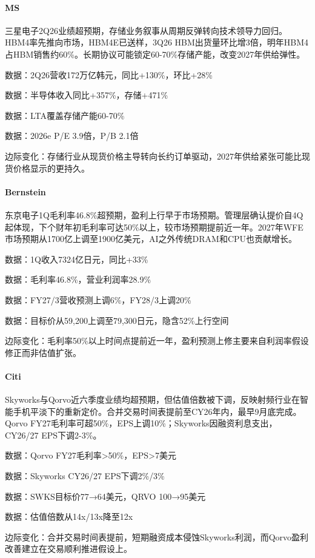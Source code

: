 \documentclass[11pt]{ctexart}
\begin{document}
\paragraph{MS} 三星电子2Q26业绩超预期，存储业务叙事从周期反弹转向技术领导力回归。HBM4率先推向市场，HBM4E已送样，3Q26 HBM出货量环比增3倍，明年HBM4占HBM销售约60\%。长期协议可能锁定60-70\%存储产能，改变2027年供给弹性。
{\small\color{refgray}数据：2Q26营收172万亿韩元，同比+130\%，环比+28\%\par}
{\small\color{refgray}数据：半导体收入同比+357\%，存储+471\%\par}
{\small\color{refgray}数据：LTA覆盖存储产能60-70\%\par}
{\small\color{refgray}数据：2026e P/E 3.9倍，P/B 2.1倍\par}
{\small\color{refgray}边际变化：存储行业从现货价格主导转向长约订单驱动，2027年供给紧张可能比现货价格显示的更持久。\par}
\paragraph{Bernstein} 东京电子1Q毛利率46.8\%超预期，盈利上行早于市场预期。管理层确认提价自4Q起体现，下个财年初毛利率可达50\%以上，较市场预期提前近一年。2027年WFE市场预期从1700亿上调至1900亿美元，AI之外传统DRAM和CPU也贡献增长。
{\small\color{refgray}数据：1Q收入7324亿日元，同比+33\%\par}
{\small\color{refgray}数据：毛利率46.8\%，营业利润率28.9\%\par}
{\small\color{refgray}数据：FY27/3营收预测上调6\%，FY28/3上调20\%\par}
{\small\color{refgray}数据：目标价从59,200上调至79,300日元，隐含52\%上行空间\par}
{\small\color{refgray}边际变化：毛利率50\%以上时间点提前近一年，盈利预测上修主要来自利润率假设修正而非估值扩张。\par}
\paragraph{Citi} Skyworks与Qorvo近六季度业绩均超预期，但估值倍数被下调，反映射频行业在智能手机平淡下的重新定价。合并交易时间表提前至CY26年内，最早9月底完成。Qorvo FY27毛利率可超50\%，EPS上调10\%；Skyworks因融资利息支出，CY26/27 EPS下调2-3\%。
{\small\color{refgray}数据：Qorvo FY27毛利率>50\%，EPS>7美元\par}
{\small\color{refgray}数据：Skyworks CY26/27 EPS下调2\%/3\%\par}
{\small\color{refgray}数据：SWKS目标价77→64美元，QRVO 100→95美元\par}
{\small\color{refgray}数据：估值倍数从14x/13x降至12x\par}
{\small\color{refgray}边际变化：合并交易时间表提前，短期融资成本侵蚀Skyworks利润，而Qorvo盈利改善建立在交易顺利推进假设上。\par}
\end{document}
